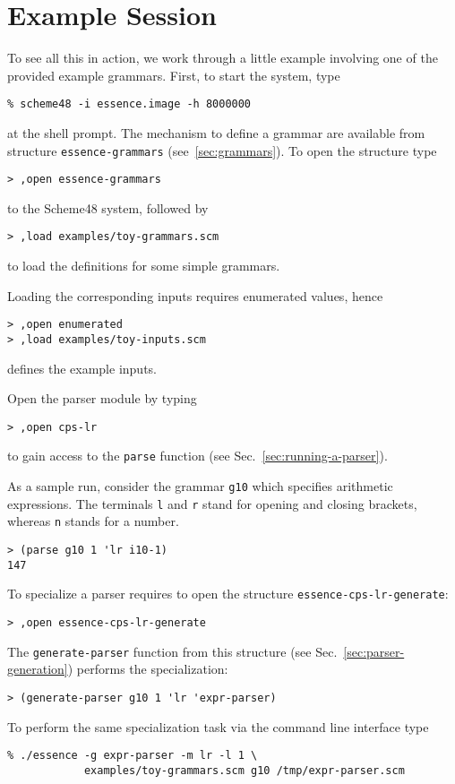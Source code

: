 \documentclass{article}
\newcommand{\codefont}[1]{\texttt{#1}}
\begin{document}
\section{Example Session}
\label{sec:example-session}

To see all this in action, we work through a little example involving one of
the provided example grammars. First, to start the system, type
\begin{verbatim}
% scheme48 -i essence.image -h 8000000
\end{verbatim}
at the shell prompt. The mechanism to define a grammar are available from
structure \codefont{essence-grammars} (see~\ref{sec:grammars}). To open the structure
type
\begin{verbatim}
> ,open essence-grammars
\end{verbatim}
to the Scheme48 system, followed by
\begin{verbatim}
> ,load examples/toy-grammars.scm
\end{verbatim}
to load the definitions for some simple grammars.

Loading the corresponding inputs requires enumerated values, hence
\begin{verbatim}
> ,open enumerated
> ,load examples/toy-inputs.scm
\end{verbatim}
defines the example inputs.

Open the parser module by typing
\begin{verbatim}
> ,open cps-lr
\end{verbatim}
to gain access to the \codefont{parse}
function (see Sec.~\ref{sec:running-a-parser}). 

As a sample run, consider the grammar \codefont{g10} which specifies arithmetic 
expressions. The terminals \codefont{l} and \codefont{r} stand for opening
and closing brackets, whereas \codefont{n} stands for a number.
\begin{verbatim}
> (parse g10 1 'lr i10-1)
147
\end{verbatim}

To specialize a parser requires to open the structure
\codefont{essence-cps-lr-generate}:
\begin{verbatim}
> ,open essence-cps-lr-generate
\end{verbatim}
The \codefont{generate-parser} function from this structure (see
Sec.~\ref{sec:parser-generation}) performs the specialization:
\begin{verbatim}
> (generate-parser g10 1 'lr 'expr-parser)
\end{verbatim}

To perform the same specialization task via the command line interface type
\begin{verbatim}
% ./essence -g expr-parser -m lr -l 1 \
            examples/toy-grammars.scm g10 /tmp/expr-parser.scm
\end{verbatim}

 

\end{document}
